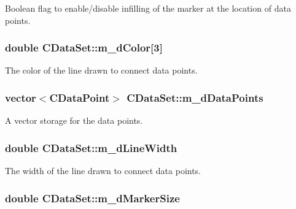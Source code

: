 Boolean flag to enable/disable infilling of the marker at the location of data points. \hypertarget{class_c_data_set_a1f609c3fdd48cd720a5b0dd332fb05f8}{
\subsubsection[{m\-\_\-d\-Color}]{\setlength{\rightskip}{0pt plus 5cm}double C\-Data\-Set\-::m\-\_\-d\-Color\mbox{[}3\mbox{]}\hspace{0.3cm}{\ttfamily [protected]}}}\label{class_c_data_set_a1f609c3fdd48cd720a5b0dd332fb05f8}
The color of the line drawn to connect data points. \hypertarget{class_c_data_set_ac88fb811a8eab6592b479e425d476ba7}{
\subsubsection[{m\-\_\-d\-Data\-Points}]{\setlength{\rightskip}{0pt plus 5cm}vector$<${\bf C\-Data\-Point}$>$ C\-Data\-Set\-::m\-\_\-d\-Data\-Points\hspace{0.3cm}{\ttfamily [protected]}}}\label{class_c_data_set_ac88fb811a8eab6592b479e425d476ba7}
A vector storage for the data points. \hypertarget{class_c_data_set_afc6d30d7f5202542fe346bd4f02d2699}{
\subsubsection[{m\-\_\-d\-Line\-Width}]{\setlength{\rightskip}{0pt plus 5cm}double C\-Data\-Set\-::m\-\_\-d\-Line\-Width\hspace{0.3cm}{\ttfamily [protected]}}}\label{class_c_data_set_afc6d30d7f5202542fe346bd4f02d2699}
The width of the line drawn to connect data points. \hypertarget{class_c_data_set_a76de3bd40a039665d8a71164972f5d0b}{
\subsubsection[{m\-\_\-d\-Marker\-Size}]{\setlength{\rightskip}{0pt plus 5cm}double C\-Data\-Set\-::m\-\_\-d\-Marker\-Size\hspace{0.3cm}{\ttfamily [protected]}}}\label{class_c_data_set_a76de3bd40a039665d8a71164972f5d0b}
